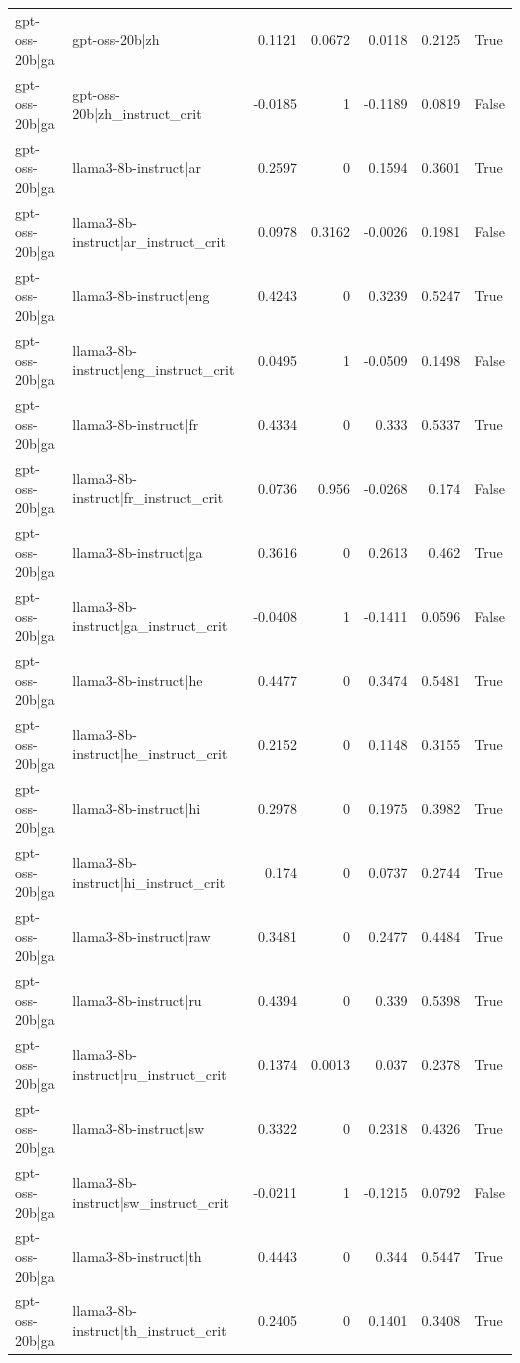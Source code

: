 \begin{table}
\begin{tabular}{l l r r r r l}
gpt-oss-20b|ga & gpt-oss-20b|zh & 0.1121 & 0.0672 & 0.0118 & 0.2125 & True \\
gpt-oss-20b|ga & gpt-oss-20b|zh_instruct_crit & -0.0185 & 1 & -0.1189 & 0.0819 & False \\
gpt-oss-20b|ga & llama3-8b-instruct|ar & 0.2597 & 0 & 0.1594 & 0.3601 & True \\
gpt-oss-20b|ga & llama3-8b-instruct|ar_instruct_crit & 0.0978 & 0.3162 & -0.0026 & 0.1981 & False \\
gpt-oss-20b|ga & llama3-8b-instruct|eng & 0.4243 & 0 & 0.3239 & 0.5247 & True \\
gpt-oss-20b|ga & llama3-8b-instruct|eng_instruct_crit & 0.0495 & 1 & -0.0509 & 0.1498 & False \\
gpt-oss-20b|ga & llama3-8b-instruct|fr & 0.4334 & 0 & 0.333 & 0.5337 & True \\
gpt-oss-20b|ga & llama3-8b-instruct|fr_instruct_crit & 0.0736 & 0.956 & -0.0268 & 0.174 & False \\
gpt-oss-20b|ga & llama3-8b-instruct|ga & 0.3616 & 0 & 0.2613 & 0.462 & True \\
gpt-oss-20b|ga & llama3-8b-instruct|ga_instruct_crit & -0.0408 & 1 & -0.1411 & 0.0596 & False \\
gpt-oss-20b|ga & llama3-8b-instruct|he & 0.4477 & 0 & 0.3474 & 0.5481 & True \\
gpt-oss-20b|ga & llama3-8b-instruct|he_instruct_crit & 0.2152 & 0 & 0.1148 & 0.3155 & True \\
gpt-oss-20b|ga & llama3-8b-instruct|hi & 0.2978 & 0 & 0.1975 & 0.3982 & True \\
gpt-oss-20b|ga & llama3-8b-instruct|hi_instruct_crit & 0.174 & 0 & 0.0737 & 0.2744 & True \\
gpt-oss-20b|ga & llama3-8b-instruct|raw & 0.3481 & 0 & 0.2477 & 0.4484 & True \\
gpt-oss-20b|ga & llama3-8b-instruct|ru & 0.4394 & 0 & 0.339 & 0.5398 & True \\
gpt-oss-20b|ga & llama3-8b-instruct|ru_instruct_crit & 0.1374 & 0.0013 & 0.037 & 0.2378 & True \\
gpt-oss-20b|ga & llama3-8b-instruct|sw & 0.3322 & 0 & 0.2318 & 0.4326 & True \\
gpt-oss-20b|ga & llama3-8b-instruct|sw_instruct_crit & -0.0211 & 1 & -0.1215 & 0.0792 & False \\
gpt-oss-20b|ga & llama3-8b-instruct|th & 0.4443 & 0 & 0.344 & 0.5447 & True \\
gpt-oss-20b|ga & llama3-8b-instruct|th_instruct_crit & 0.2405 & 0 & 0.1401 & 0.3408 & True \\

\end{tabular}
\end{table}
